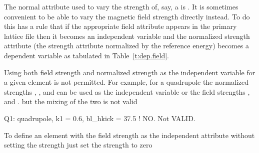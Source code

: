 The normal attribute used to vary the strength of, say, a
 is .  It is sometimes convenient to be able to
vary the magnetic field strength directly instead. To do this \bmad
has a rule that if the appropriate field attribute appears in the
primary lattice file then it becomes an independent variable and the
normalized strength attribute (the strength attribute normalized by
the reference energy) becomes a dependent variable as tabulated in
Table~\ref{t:dep.field}.
\begin{table}[ht]
\caption {Field and Strength Attributes.}
\label{t:dep.field}
\end{table}
Using both field strength and normalized strength as the independent
variable for a given element is not permitted. For example, for a quadrupole the 
normalized strengths , , and  can be used as the
independent variable or the field strengths ,  and
. but the mixing of the two is not valid
\begin{example}
  Q1: quadrupole, k1 = 0.6, bl_hkick = 37.5  ! NO. Not VALID.
\end{example}
To define an element with the field strength as the independent
attribute without setting the strength just set the strength to zero

